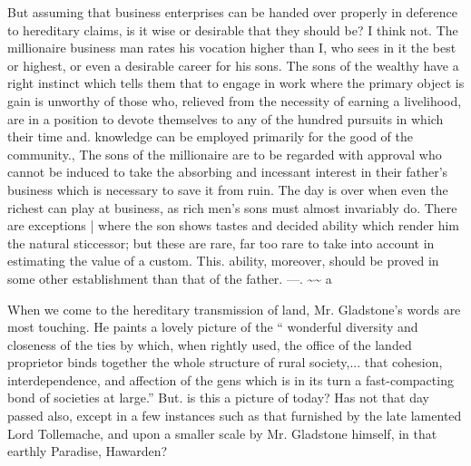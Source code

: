 \documentclass[11pt,openany]{book}
\begin{document}
But assuming that business enterprises can be handed over properly in deference to hereditary claims, is it wise or desirable that they should be? I think not. The millionaire business man rates his vocation higher than I, who sees in it the best or highest, or even a desirable career for his sons. The sons of the wealthy have a right instinct which tells them that to engage in work where the primary object is gain is unworthy of those who, relieved from the necessity of earning a livelihood, are in a position to devote themselves to any of the hundred pursuits in which their time and. knowledge can be employed primarily for the good of the community., The sons of the millionaire are to be regarded with approval who cannot be induced to take the absorbing and incessant interest in their father's business which is necessary to save it from ruin. The day is over when even the richest can play at business, as rich men's sons must almost invariably do. There are exceptions | where the son shows tastes and decided ability which render him the natural sticcessor; but these are rare, far too rare to take into account in estimating the value of a custom. This. ability, moreover, should be proved in some other establishment than that of the father. ---. \textasciitilde{}\textasciitilde{} a

When we come to the hereditary transmission of land, Mr. Gladstone's words are most touching. He paints a lovely picture of the `` wonderful diversity and closeness of the ties by which, when rightly used, the office of the landed proprietor binds together the whole structure of rural society,... that cohesion, interdependence, and affection of the gens which is in its turn a fast-compacting bond of societies at large.'' But. is this a picture of today? Has not that day passed also, except in a few instances such as that furnished by the late lamented Lord Tollemache, and upon a smaller scale by Mr. Gladstone himself, in that earthly Paradise, Hawarden?
\end{document}
